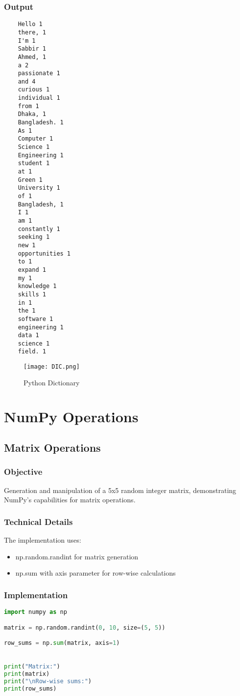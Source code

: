\documentclass[12pt]{article}
\begin{document}
\subsubsection{Output}
\begin{verbatim}
    Hello 1
    there, 1
    I'm 1
    Sabbir 1
    Ahmed, 1
    a 2
    passionate 1
    and 4
    curious 1
    individual 1
    from 1
    Dhaka, 1
    Bangladesh. 1
    As 1
    Computer 1
    Science 1
    Engineering 1
    student 1
    at 1
    Green 1
    University 1
    of 1
    Bangladesh, 1
    I 1
    am 1
    constantly 1
    seeking 1
    new 1
    opportunities 1
    to 1
    expand 1
    my 1
    knowledge 1
    skills 1
    in 1
    the 1
    software 1
    engineering 1
    data 1
    science 1
    field. 1
\end{verbatim}
\begin{figure}[h]
    \centering
    \texttt{[image: DIC.png]}
    \caption{Python Dictionary}
    \label{fig:enter-label}
\end{figure}

\section{NumPy Operations}

\subsection{Matrix Operations\hfill\href{https://github.com/sabbirahmed404/Python-Practice/blob/main/numpy_1.py}{\faGithub}}
\subsubsection{Objective}
Generation and manipulation of a 5x5 random integer matrix, demonstrating NumPy's capabilities for matrix operations.

\subsubsection{Technical Details}
The implementation uses:
\begin{itemize}
    \item np.random.randint for matrix generation
    \item np.sum with axis parameter for row-wise calculations
\end{itemize}

\subsubsection{Implementation}
\begin{lstlisting}[language=Python, caption=Matrix Operations Implementation]
import numpy as np

matrix = np.random.randint(0, 10, size=(5, 5))

row_sums = np.sum(matrix, axis=1)


print("Matrix:")
print(matrix)
print("\nRow-wise sums:")
print(row_sums)
\end{lstlisting}
\end{document}
